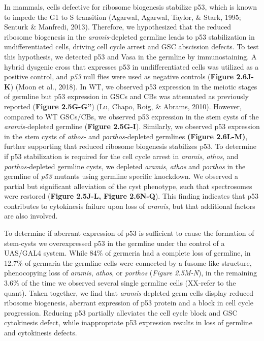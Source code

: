 \documentclass[12pt,oneside]{reedthesis}
\begin{document}
In mammals, cells defective for ribosome biogenesis stabilize p53, which
is known to impede the G1 to S transition (Agarwal, Agarwal, Taylor, \& Stark, 1995; Senturk \& Manfredi, 2013). Therefore, we hypothesized that the reduced
ribosome biogenesis in the \emph{aramis}-depleted germline leads to p53
stabilization in undifferentiated cells, driving cell cycle arrest and
GSC abscission defects. To test this hypothesis, we detected p53 and
Vasa in the germline by immunostaining. A hybrid dysgenic cross that
expresses p53 in undifferentiated cells was utilized as a positive
control, and \emph{p53} null flies were used as negative controls (\textbf{Figure 2.6J-K}) (Moon et al., 2018). In WT, we observed p53 expression in the
meiotic stages of germline but p53 expression in GSCs and CBs was
attenuated as previously reported (\textbf{Figure 2.5G-G''})
(Lu, Chapo, Roig, \& Abrams, 2010). However, compared to WT
GSCs/CBs, we observed p53 expression in the stem cysts of the
\emph{aramis-}depleted germline (\textbf{Figure 2.5G-I}). Similarly, we observed p53
expression in the stem cysts of \emph{athos-} and \emph{porthos-}depleted
germlines \textbf{(Figure 2.6L-M)}, further supporting that reduced ribosome
biogenesis stabilizes p53. To determine if p53 stabilization is required
for the cell cycle arrest in \emph{aramis}, \emph{athos}, and \emph{porthos-}depleted
germline cysts, we depleted \emph{aramis}, \emph{athos} and \emph{porthos} in the
germline of \emph{p53} mutants using germline specific knockdown. We observed
a partial but significant alleviation of the cyst phenotype, such that
spectrosomes were restored (\textbf{Figure 2.5J-L, Figure 2.6N-Q}). This finding
indicates that p53 contributes to cytokinesis failure upon loss of
\emph{aramis}, but that additional factors are also involved.

To determine if aberrant expression of p53 is sufficient to cause the
formation of stem-cysts we overexpressed p53 in the germline under the
control of a UAS/GAL4 system. While 84\% of germeria had a complete loss
of germline, in 12.7\% of germaria the germline cells were connected by a
fusome-like structure, phenocopying loss of \emph{aramis}, \emph{athos}, or
\emph{porthos} (\emph{Figure 2.5M-N}), in the remaining 3.6\% of the time we observed
several single germline cells (XX-refer to the quant). Taken together,
we find that \emph{aramis-}depleted germ cells display reduced ribosome
biogenesis, aberrant expression of p53 protein and a block in cell cycle
progression. Reducing p53 partially alleviates the cell cycle block and
GSC cytokinesis defect, while inappropriate p53 expression results in
loss of germline and cytokinesis defects.
\end{document}
